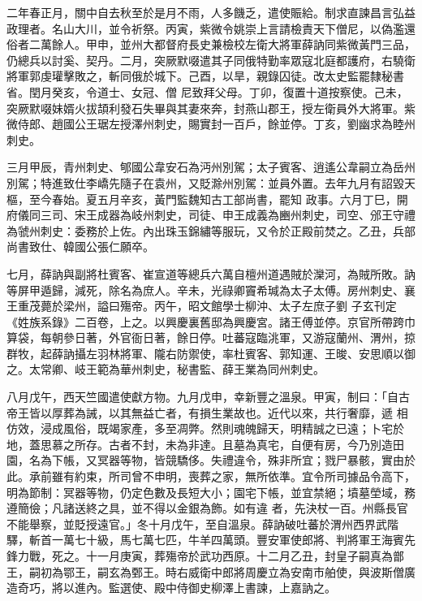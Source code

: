 \begin{pinyinscope}
 二年春正月，關中自去秋至於是月不雨，人多饑乏，遣使賑給。制求直諫昌言弘益政理者。名山大川，並令祈祭。丙寅，紫微令姚崇上言請檢責天下僧尼，以偽濫還俗者二萬餘人。甲申，並州大都督府長史兼檢校左衛大將軍薛訥同紫微黃門三品，仍總兵以討奚、契丹。二月，突厥默啜遣其子同俄特勤率眾寇北庭都護府，右驍衛將軍郭虔瓘擊敗之，斬同俄於城下。己酉，以旱，親錄囚徒。改太史監罷隸秘書省。閏月癸亥，令道士、女冠、僧
 尼致拜父母。丁卯，復置十道按察使。己未，突厥默啜妹婿火拔頡利發石失畢與其妻來奔，封燕山郡王，授左衛員外大將軍。紫微侍郎、趙國公王琚左授澤州刺史，賜實封一百戶，餘並停。丁亥，劉幽求為睦州刺史。



 三月甲辰，青州刺史、郇國公韋安石為沔州別駕；太子賓客、逍遙公韋嗣立為岳州別駕；特進致仕李嶠先隨子在袁州，又貶滁州別駕：並員外置。去年九月有詔毀天樞，至今春始。夏五月辛亥，黃門監魏知古工部尚書，罷知
 政事。六月丁巳，開府儀同三司、宋王成器為岐州刺史，司徒、申王成義為豳州刺史，司空、邠王守禮為虢州刺史：委務於上佐。內出珠玉錦繡等服玩，又令於正殿前焚之。乙丑，兵部尚書致仕、韓國公張仁願卒。



 七月，薛訥與副將杜賓客、崔宣道等總兵六萬自檀州道遇賊於灤河，為賊所敗。訥等屏甲遁歸，減死，除名為庶人。辛未，光祿卿竇希瑊為太子太傅。房州刺史、襄王重茂薨於梁州，謚曰殤帝。丙午，昭文館學士柳沖、太子左庶子劉
 子玄刊定《姓族系錄》二百卷，上之。以興慶裏舊邸為興慶宮。諸王傅並停。京官所帶跨巾算袋，每朝參日著，外官衙日著，餘日停。吐蕃寇臨洮軍，又游寇蘭州、渭州，掠群牧，起薛訥攝左羽林將軍、隴右防禦使，率杜賓客、郭知運、王晙、安思順以御之。太常卿、岐王範為華州刺史，秘書監、薛王業為同州刺史。



 八月戊午，西天竺國遣使獻方物。九月戊申，幸新豐之溫泉。甲寅，制曰：「自古帝王皆以厚葬為誡，以其無益亡者，有損生業故也。近代以來，共行奢靡，遞
 相仿效，浸成風俗，既竭家產，多至凋弊。然則魂魄歸天，明精誠之已遠；卜宅於地，蓋思慕之所存。古者不封，未為非達。且墓為真宅，自便有房，今乃別造田園，名為下帳，又冥器等物，皆競驕侈。失禮違令，殊非所宜；戮尸暴骸，實由於此。承前雖有約束，所司曾不申明，喪葬之家，無所依準。宜令所司據品令高下，明為節制：冥器等物，仍定色數及長短大小；園宅下帳，並宜禁絕；墳墓塋域，務遵簡儉；凡諸送終之具，並不得以金銀為飾。如有違
 者，先決杖一百。州縣長官不能舉察，並貶授遠官。」冬十月戊午，至自溫泉。薛訥破吐蕃於渭州西界武階驛，斬首一萬七十級，馬七萬七匹，牛羊四萬頭。豐安軍使郎將、判將軍王海賓先鋒力戰，死之。十一月庚寅，葬殤帝於武功西原。十二月乙丑，封皇子嗣真為鄫王，嗣初為鄂王，嗣玄為鄄王。時右威衛中郎將周慶立為安南市舶使，與波斯僧廣造奇巧，將以進內。監選使、殿中侍御史柳澤上書諫，上嘉訥之。




\end{pinyinscope}
